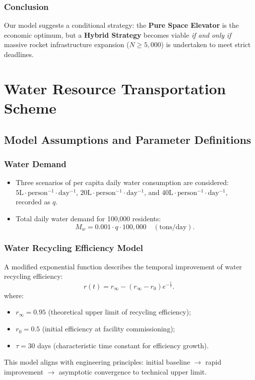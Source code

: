 \documentclass{mcmthesis}
\begin{document}
\subsubsection{Conclusion}
Our model suggests a conditional strategy: the \textbf{Pure Space Elevator} is the economic optimum, but a \textbf{Hybrid Strategy} becomes viable \textit{if and only if} massive rocket infrastructure expansion ($N \ge 5,000$) is undertaken to meet strict deadlines.


\section{Water Resource Transportation Scheme}

\subsection{Model Assumptions and Parameter Definitions}

\subsubsection{Water Demand}
\begin{itemize}
\item Three scenarios of per capita daily water consumption are considered: $5 \mathrm{L\cdot person^{-1}\cdot day^{-1}}$, $20 \mathrm{L\cdot person^{-1}\cdot day^{-1}}$, and $40 \mathrm{L\cdot person^{-1}\cdot day^{-1}}$, recorded as $q$.
\item Total daily water demand for 100,000 residents:
\begin{equation}
    M_w=0.001\cdot q\cdot100,000 \quad (\text{tons/day}).
\end{equation}
\end{itemize}

\subsubsection{Water Recycling Efficiency Model}
A modified exponential function describes the temporal improvement of water recycling efficiency:
\begin{equation}
    r(t)=r_{\infty} - (r_{\infty} - r_0)e^{-\frac{t}{\tau}}.
\end{equation}
where:
\begin{itemize}
\item $r_\infty=0.95$ (theoretical upper limit of recycling efficiency);
\item $r_0=0.5$ (initial efficiency at facility commissioning);
\item $\tau=30$ days (characteristic time constant for efficiency growth).
\end{itemize}
This model aligns with engineering principles: initial baseline $\to$ rapid improvement $\to$ asymptotic convergence to technical upper limit.
\end{document}
